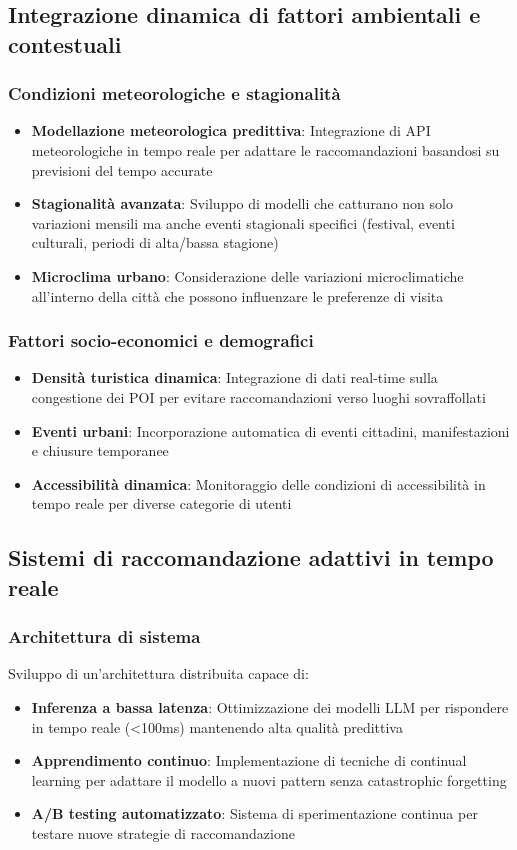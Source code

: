 \subsection{Integrazione dinamica di fattori ambientali e contestuali}

\subsubsection{Condizioni meteorologiche e stagionalità}
\begin{itemize}
\item \textbf{Modellazione meteorologica predittiva}: Integrazione di API meteorologiche in tempo reale per adattare le raccomandazioni basandosi su previsioni del tempo accurate
\item \textbf{Stagionalità avanzata}: Sviluppo di modelli che catturano non solo variazioni mensili ma anche eventi stagionali specifici (festival, eventi culturali, periodi di alta/bassa stagione)
\item \textbf{Microclima urbano}: Considerazione delle variazioni microclimatiche all'interno della città che possono influenzare le preferenze di visita
\end{itemize}

\subsubsection{Fattori socio-economici e demografici}
\begin{itemize}
\item \textbf{Densità turistica dinamica}: Integrazione di dati real-time sulla congestione dei POI per evitare raccomandazioni verso luoghi sovraffollati
\item \textbf{Eventi urbani}: Incorporazione automatica di eventi cittadini, manifestazioni e chiusure temporanee
\item \textbf{Accessibilità dinamica}: Monitoraggio delle condizioni di accessibilità in tempo reale per diverse categorie di utenti
\end{itemize}

\subsection{Sistemi di raccomandazione adattivi in tempo reale}

\subsubsection{Architettura di sistema}
Sviluppo di un'architettura distribuita capace di:
\begin{itemize}
\item \textbf{Inferenza a bassa latenza}: Ottimizzazione dei modelli LLM per rispondere in tempo reale (<100ms) mantenendo alta qualità predittiva
\item \textbf{Apprendimento continuo}: Implementazione di tecniche di continual learning per adattare il modello a nuovi pattern senza catastrophic forgetting
\item \textbf{A/B testing automatizzato}: Sistema di sperimentazione continua per testare nuove strategie di raccomandazione
\end{itemize}

